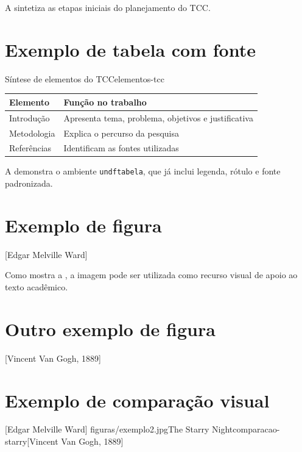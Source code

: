 A  sintetiza as etapas iniciais do planejamento do TCC.

\section{Exemplo de tabela com fonte}

\begin{undftabela}{Síntese de elementos do TCC}{elementos-tcc}
	\begin{tabular}{p{} p{}}
		\hline
		\textbf{Elemento} & \textbf{Função no trabalho} \\
		\hline
		Introdução & Apresenta tema, problema, objetivos e justificativa \\
		Metodologia & Explica o percurso da pesquisa \\
		Referências & Identificam as fontes utilizadas \\
		\hline
	\end{tabular}
\end{undftabela}

A  demonstra o ambiente \verb|undftabela|, que já inclui legenda, rótulo e fonte padronizada.

\section{Exemplo de figura}

[Edgar Melville Ward]

Como mostra a , a imagem pode ser utilizada como recurso visual de apoio ao texto acadêmico.

\section{Outro exemplo de figura}

[Vincent Van Gogh, 1889]

\section{Exemplo de comparação visual}

[Edgar Melville Ward]
	{figuras/exemplo2.jpg}{The Starry Night}{comparacao-starry}[Vincent Van Gogh, 1889]


